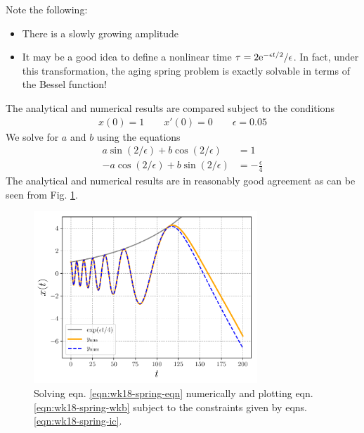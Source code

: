 Note the following:
\begin{itemize}
	\item There is a slowly growing amplitude 
	\item It may be a good idea to define a nonlinear time $\tau = 2 \mathrm{e}^{-\epsilon t/2}/\epsilon$. In fact, under this transformation, the aging spring problem is exactly solvable in terms of the Bessel function!
\end{itemize}
The analytical and numerical results are compared subject to the conditions
\begin{gather}
	x(0)=1 \qquad x'(0)=0 \qquad \epsilon=0.05 \label{eqn:wk18-spring-ic}
\end{gather}
We solve for $a$ and $b$ using the equations
\begin{align*}
	a \sin (2/\epsilon) + b \cos(2/\epsilon) &= 1 \\
	-a \cos(2/\epsilon) + b \sin(2/\epsilon) &= -\frac{\epsilon}{4}
\end{align*}
The analytical and numerical results are in reasonably good agreement as can be seen from Fig. \ref{fig:strogatz-wk18}.
\begin{figure}[!h]
	\centering
	\includegraphics[width=0.75\textwidth]{./plots/pdf/strogatz-wk18.pdf}
	\caption{Solving eqn. \ref{eqn:wk18-spring-eqn} numerically and plotting eqn. \ref{eqn:wk18-spring-wkb} subject to the constraints given by eqns. \ref{eqn:wk18-spring-ic}.}
	\label{fig:strogatz-wk18}
\end{figure}







